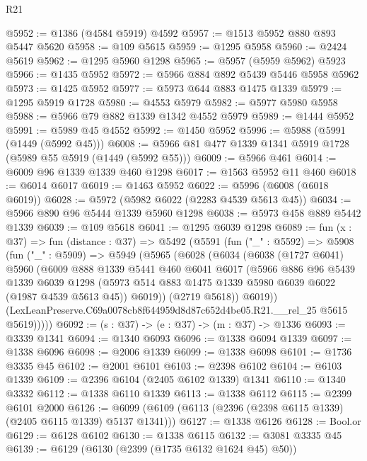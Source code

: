 \begin{lexlean}{R21}
\begin{coremodule}
@5952 := @1386 (@4584 @5919) @4592
@5957 := @1513 @5952 @880 @893 @5447 @5620
@5958 := @109 @5615
@5959 := @1295 @5958
@5960 := @2424 @5619
@5962 := @1295 @5960 @1298
@5965 := @5957 (@5959 @5962) @5923
@5966 := @1435 @5952
@5972 := @5966 @884 @892 @5439 @5446 @5958 @5962
@5973 := @1425 @5952
@5977 := @5973 @644 @883 @1475 @1339
@5979 := @1295 @5919 @1728
@5980 := @4553 @5979
@5982 := @5977 @5980 @5958
@5988 := @5966 @79 @882 @1339 @1342 @4552 @5979
@5989 := @1444 @5952
@5991 := @5989 @45 @4552
@5992 := @1450 @5952
@5996 := @5988 (@5991 (@1449 (@5992 @45)))
@6008 := @5966 @81 @477 @1339 @1341 @5919 @1728 (@5989 @55 @5919 (@1449 (@5992 @55)))
@6009 := @5966 @461
@6014 := @6009 @96 @1339 @1339 @460 @1298
@6017 := @1563 @5952 @11 @460
@6018 := @6014 @6017
@6019 := @1463 @5952
@6022 := @5996 (@6008 (@6018 @6019))
@6028 := @5972 (@5982 @6022 (@2283 @4539 @5613 @45))
@6034 := @5966 @890 @96 @5444 @1339 @5960 @1298
@6038 := @5973 @458 @889 @5442 @1339
@6039 := @109 @5618
@6041 := @1295 @6039 @1298
@6089 := fun (x : @37) =>
  fun (distance : @37) =>
  @5492
    (@5591
      (fun ("_" : @5592) =>
      @5908
        (fun ("_" : @5909) =>
        @5949
          (@5965
            (@6028
              (@6034
                (@6038
                  (@1727 @6041)
                  @5960
                  (@6009
                    @888
                    @1339
                    @5441
                    @460
                    @6041
                    @6017
                    (@5966
                      @886
                      @96
                      @5439
                      @1339
                      @6039
                      @1298
                      (@5973 @514 @883 @1475 @1339 @5980 @6039 @6022 (@1987 @4539 @5613 @45))
                      @6019))
                  (@2719 @5618))
                @6019))
            (LexLeanPreserve.C69a0078cb8f644959d8d87c652d4be05.R21.__rel_25 @5615 @5619)))))
@6092 := (s : @37) -> (e : @37) -> (m : @37) -> @1336
@6093 := @3339 @1341
@6094 := @1340 @6093
@6096 := @1338 @6094 @1339
@6097 := @1338 @6096
@6098 := @2006 @1339
@6099 := @1338 @6098
@6101 := @1736 @3335 @45
@6102 := @2001 @6101
@6103 := @2398 @6102
@6104 := @6103 @1339
@6109 := @2396 @6104 (@2405 @6102 @1339) @1341
@6110 := @1340 @3332
@6112 := @1338 @6110 @1339
@6113 := @1338 @6112
@6115 := @2399 @6101 @2000
@6126 := @6099 (@6109 (@6113 (@2396 (@2398 @6115 @1339) (@2405 @6115 @1339) @5137 @1341)))
@6127 := @1338 @6126
@6128 := Bool.or
@6129 := @6128 @6102
@6130 := @1338 @6115
@6132 := @3081 @3335 @45
@6139 := @6129 (@6130 (@2399 (@1735 @6132 @1624 @45) @50))

\end{coremodule}
\end{lexlean}
